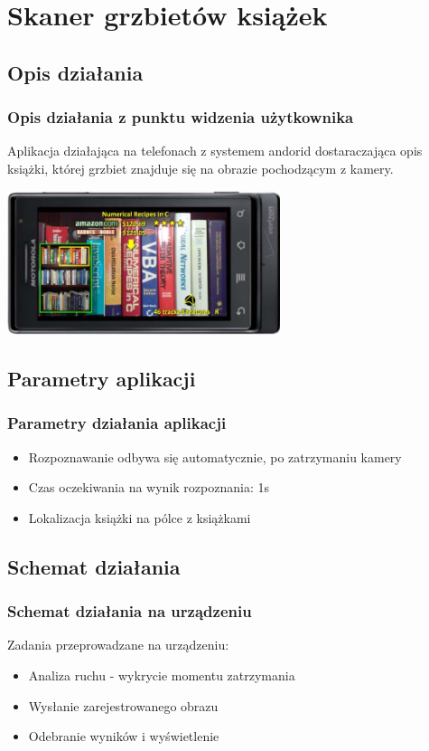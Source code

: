 \section{Skaner grzbietów książek}
\nextoc


\subsection{Opis działania}
\begin{frame}
    \frametitle{Opis działania z punktu widzenia użytkownika}
    Aplikacja działająca na telefonach z systemem andorid dostaraczająca opis książki, której grzbiet znajduje się na obrazie pochodzącym z kamery.
    
    \begin{center}
    \includegraphics[width=0.6\textwidth]{books_main}
    \end{center}
    
\end{frame}

\subsection{Parametry aplikacji}

\begin{frame}
    \frametitle{Parametry działania aplikacji}
    \begin{itemize}
        \item Rozpoznawanie odbywa się automatycznie, po zatrzymaniu kamery
        \item Czas oczekiwania na wynik rozpoznania: 1s
        \item Lokalizacja książki na pólce z książkami
    \end{itemize}
\end{frame}


\subsection{Schemat działania}
\begin{frame}
    \frametitle{Schemat działania na urządzeniu}
    Zadania przeprowadzane na urządzeniu:
    \begin{itemize}
        \item Analiza ruchu - wykrycie momentu zatrzymania
        \item Wysłanie zarejestrowanego obrazu
        \item Odebranie wyników i wyświetlenie
    \end{itemize}
\end{frame}


